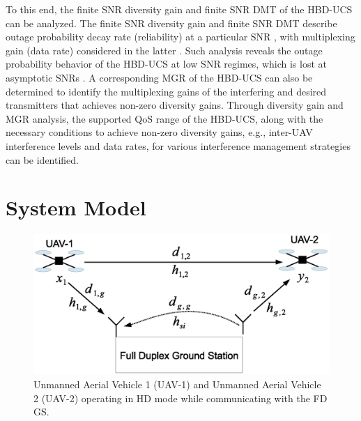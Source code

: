 To this end, the finite SNR diversity gain and finite SNR DMT of the HBD-UCS can be analyzed. The finite SNR diversity gain and finite SNR DMT describe outage probability decay rate (reliability) at a particular SNR \cite{shin2008diversity}, with multiplexing gain (data rate) considered in the latter \cite{narasimhan2006finite}. Such analysis reveals the outage probability behavior of the HBD-UCS at low SNR regimes, which is lost at asymptotic SNRs \cite{shin2008diversity}. A corresponding MGR of the HBD-UCS can also be determined \cite{karmakar2012generalized} to identify the multiplexing gains of the interfering and desired transmitters that achieves non-zero diversity gains. Through diversity gain and MGR analysis, the supported QoS range of the HBD-UCS, along with the necessary conditions to achieve non-zero diversity gains, e.g., inter-UAV interference levels and data rates, for various interference management strategies can be identified.

\section{System Model}
\begin{figure} [tpb]
\centering
\vspace{-2cm}
\includegraphics [width=0.8\columnwidth]{chap4_fig/block_diagram.eps} 
\vspace{-2.2cm}
\caption{Unmanned Aerial Vehicle 1 (UAV-1) and Unmanned Aerial Vehicle 2 (UAV-2) operating in HD mode while communicating with the FD GS.}
\label{fig:JD_HBD_UCS_1}
\end{figure}

